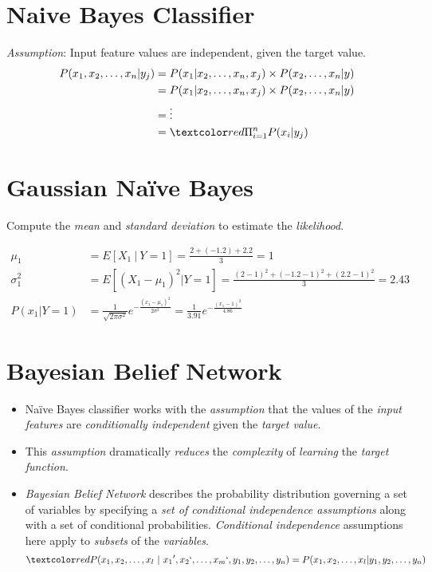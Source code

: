 \documentclass[
	number={3},
	title={Na\"{\i}ive Bayes Learning}
]{cs584notes}
\begin{document}
\section{Na\:ive Bayes Classifier}\label{sec:naive-bayes-classifier}
\emph{Assumption}: Input feature values are independent, given the target value.
\begin{equation*}
\begin{aligned}
	P(x_{1}, x_{2}, \dots, x_{n} | y_{j}) &= P(x_{1} | x_{2}, \dots, x_{n}, x_{j}) \times P(x_{2}, \dots, x_{n} | y)\\
										  &= P(x_{1} | x_{2}, \dots, x_{n}, x_{j}) \times P(x_{2}, \dots, x_{n} | y)\\
	&=\vdots\\
	&= \data{ \Pi_{i=1}^{n} P(x_{i} | y_{j}) }
\end{aligned}
\end{equation*}

\section{Gaussian Naïve Bayes}\label{sec:gaussian-naive-bayes}
Compute the \emph{mean} and \emph{standard deviation} to estimate the \emph{likelihood}.

\begin{equation*}
	\begin{aligned}
		\mu_{1} &= E[X_{1}\ |\ Y = 1] = \frac{2 + (-1.2)  + 2.2}{3} = 1\\
		\sigma_{1}^{2} &= E\left[ (X_{1} - \mu_{1})^{2} | Y = 1 \right] = \frac{(2-1)^{2} + (-1.2 - 1)^{2} + (2.2 - 1)^{2}}{3} = 2.43\\
		P(x_{1} | Y=1 ) &= \frac{1}{\sqrt{2\pi\sigma^{2}}}e^{-\frac{(x_{1} - \mu_{1})^{2}}{2\sigma^{2}}} = \frac{1}{3.91}e^{-\frac{(x_{1} - 1)^{2}}{4.86}}
	\end{aligned}
\end{equation*}

\section{Bayesian Belief Network}\label{sec:bayesian-belief-network}
\begin{itemize}
	\item Naïve Bayes classifier works with the \emph{assumption} that the values of the \emph{input features} are \emph{conditionally independent} given the \emph{target value}.
	\item This \emph{assumption} dramatically \emph{reduces} the \emph{complexity} of \emph{learning} the \emph{target function}.
	\item \emph{Bayesian Belief Network} describes the probability distribution governing a set of variables by specifying a \emph{set of conditional independence assumptions} along with a set of conditional probabilities. \emph{Conditional independence} assumptions here apply to \emph{subsets} of the \emph{variables}.
	\[ \data{ P(x_{1}, x_{2}, \dots, x_{l}\ |\ x_{1}{'}, x_{2}{`}, \dots, x_{m}{`}, y_{1}, y_{2}, \dots, y_{n}) = P(x_{1}, x_{2}, \dots, x_{l} | y_{1}, y_{2}, \dots, y_{n}) } \]
\end{itemize}
\end{document}
